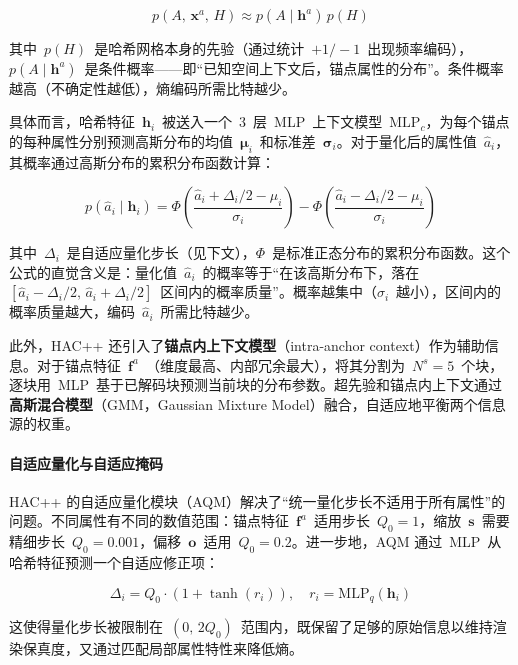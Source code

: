 \begin{equation}
p(A,\, \mathbf{x}^a,\, H) \approx p(A \mid \mathbf{h}^a)\, p(H)
\end{equation}

其中~$p(H)$~是哈希网格本身的先验（通过统计~$+1/-1$~出现频率编码），$p(A \mid \mathbf{h}^a)$~是条件概率——即``已知空间上下文后，锚点属性的分布''。条件概率越高（不确定性越低），熵编码所需比特越少。

具体而言，哈希特征~$\mathbf{h}_i$~被送入一个~3~层~MLP~上下文模型~$\text{MLP}_c$，为每个锚点的每种属性分别预测高斯分布的均值~$\boldsymbol{\mu}_i$~和标准差~$\boldsymbol{\sigma}_i$。对于量化后的属性值~$\hat{a}_i$，其概率通过高斯分布的累积分布函数计算：

\begin{equation}
p(\hat{a}_i \mid \mathbf{h}_i) = \Phi\!\left(\frac{\hat{a}_i + \Delta_i/2 - \mu_i}{\sigma_i}\right) - \Phi\!\left(\frac{\hat{a}_i - \Delta_i/2 - \mu_i}{\sigma_i}\right)
\end{equation}

其中~$\Delta_i$~是自适应量化步长（见下文），$\Phi$~是标准正态分布的累积分布函数。这个公式的直觉含义是：量化值~$\hat{a}_i$~的概率等于``在该高斯分布下，落在~$[\hat{a}_i - \Delta_i/2,\, \hat{a}_i + \Delta_i/2]$~区间内的概率质量''。概率越集中（$\sigma_i$~越小），区间内的概率质量越大，编码~$\hat{a}_i$~所需比特越少。

此外，HAC++ 还引入了\textbf{锚点内上下文模型}（intra-anchor context）作为辅助信息。对于锚点特征~$\mathbf{f}^a$~（维度最高、内部冗余最大），将其分割为~$N^s=5$~个块，逐块用~MLP~基于已解码块预测当前块的分布参数。超先验和锚点内上下文通过\textbf{高斯混合模型}（GMM，Gaussian Mixture Model）融合，自适应地平衡两个信息源的权重。

\paragraph{自适应量化与自适应掩码}

HAC++ 的自适应量化模块（AQM）解决了``统一量化步长不适用于所有属性''的问题。不同属性有不同的数值范围：锚点特征~$\mathbf{f}^a$~适用步长~$Q_0=1$，缩放~$\mathbf{s}$~需要精细步长~$Q_0=0.001$，偏移~$\mathbf{o}$~适用~$Q_0=0.2$。进一步地，AQM 通过~MLP~从哈希特征预测一个自适应修正项：

\begin{equation}
\Delta_i = Q_0 \cdot (1 + \tanh(r_i)), \quad r_i = \text{MLP}_q(\mathbf{h}_i)
\end{equation}

这使得量化步长被限制在~$(0,\, 2Q_0)$~范围内，既保留了足够的原始信息以维持渲染保真度，又通过匹配局部属性特性来降低熵。

